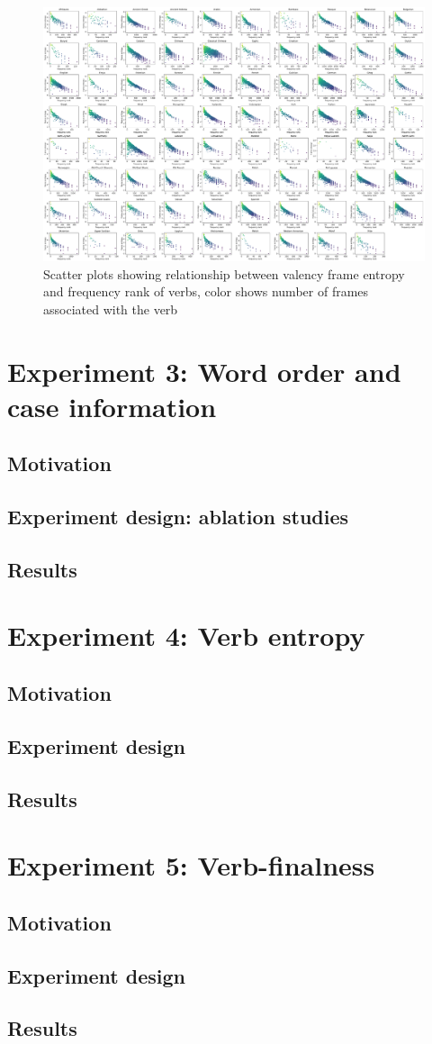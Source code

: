 \begin{figure}
  \centering
  \includegraphics[width=\textwidth]{figures/joint_entropy_freq.pdf}
  \caption{Scatter plots showing relationship between valency frame entropy and frequency rank of verbs, color shows number of frames associated with the verb}
  \label{fig:joint_entropy_freq}
\end{figure}

\section{Experiment 3: Word order and case information}
\subsection{Motivation}
\subsection{Experiment design: ablation studies}
\subsection{Results}

\section{Experiment 4: Verb entropy}
\subsection{Motivation}
\subsection{Experiment design}
\subsection{Results}

\section{Experiment 5: Verb-finalness}
\subsection{Motivation}
\subsection{Experiment design}
\subsection{Results}